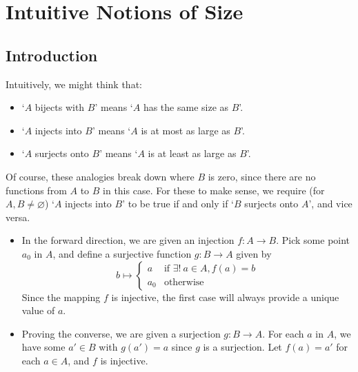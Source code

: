 \documentclass{article}
\begin{document}
\section{Intuitive Notions of Size}
\subsection{Introduction}
Intuitively, we might think that:
\begin{itemize}
	\item `$A$ bijects with $B$' means `$A$ has the same size as $B$'.
	\item `$A$ injects into $B$' means `$A$ is at most as large as $B$'.
	\item `$A$ surjects onto $B$' means `$A$ is at least as large as $B$'.
\end{itemize}
Of course, these analogies break down where $B$ is zero, since there are no functions from $A$ to $B$ in this case. For these to make sense, we require (for $A, B\neq\varnothing$) `$A$ injects into $B$' to be true if and only if `$B$ surjects onto $A$', and vice versa.
\begin{itemize}
	\item In the forward direction, we are given an injection $f\colon A \to B$. Pick some point $a_0$ in $A$, and define a surjective function $g\colon B \to A$ given by
	      \[ b \mapsto \begin{cases}
			      a   & \text{if } \exists!\ a \in A, f(a) = b \\
			      a_0 & \text{otherwise}
		      \end{cases} \]
	      Since the mapping $f$ is injective, the first case will always provide a unique value of $a$.
	\item Proving the converse, we are given a surjection $g\colon B \to A$. For each $a$ in $A$, we have some $a' \in B$ with $g(a') = a$ since $g$ is a surjection. Let $f(a) = a'$ for each $a\in A$, and $f$ is injective.
\end{itemize}
\end{document}
